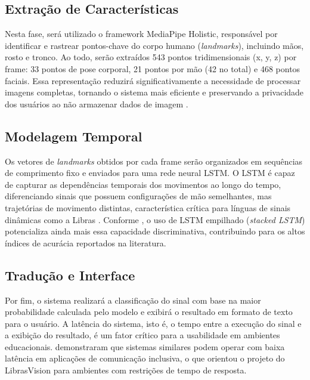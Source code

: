 \subsection{Extração de Características}

Nesta fase, será utilizado o framework MediaPipe Holistic, responsável por identificar e rastrear pontos-chave do corpo humano (\textit{landmarks}), incluindo mãos, rosto e tronco. Ao todo, serão extraídos 543 pontos tridimensionais (x, y, z) por frame: 33 pontos de pose corporal, 21 pontos por mão (42 no total) e 468 pontos faciais. Essa representação reduzirá significativamente a necessidade de processar imagens completas, tornando o sistema mais eficiente e preservando a privacidade dos usuários ao não armazenar dados de imagem \cite{varshini:25,anithadevi:25,maia:25}.

\subsection{Modelagem Temporal}

Os vetores de \textit{landmarks} obtidos por cada frame serão organizados em sequências de comprimento fixo e enviados para uma rede neural LSTM. O LSTM é capaz de capturar as dependências temporais dos movimentos ao longo do tempo, diferenciando sinais que possuem configurações de mão semelhantes, mas trajetórias de movimento distintas, característica crítica para línguas de sinais dinâmicas como a Libras \cite{kamble:25,navendu:24}. Conforme , o uso de LSTM empilhado (\textit{stacked LSTM}) potencializa ainda mais essa capacidade discriminativa, contribuindo para os altos índices de acurácia reportados na literatura.

\subsection{Tradução e Interface}

Por fim, o sistema realizará a classificação do sinal com base na maior probabilidade calculada pelo modelo e exibirá o resultado em formato de texto para o usuário. A latência do sistema, isto é, o tempo entre a execução do sinal e a exibição do resultado, é um fator crítico para a usabilidade em ambientes educacionais.  demonstraram que sistemas similares podem operar com baixa latência em aplicações de comunicação inclusiva, o que orientou o projeto do LibrasVision para ambientes com restrições de tempo de resposta.

